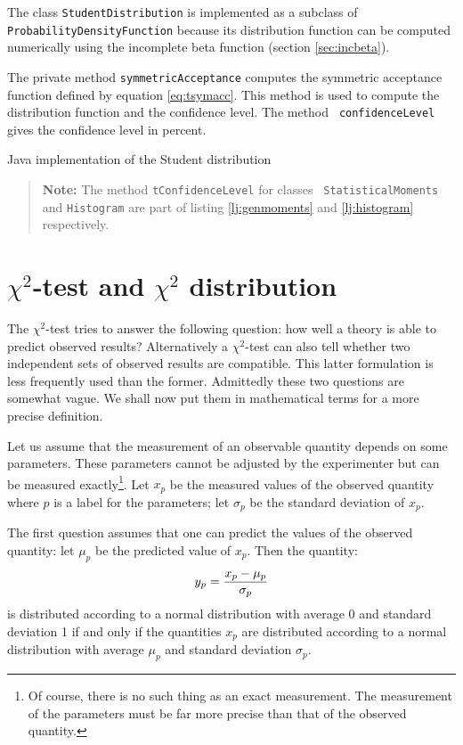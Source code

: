 \documentclass[twoside]{book}
\begin{document}
The class {\tt StudentDistribution} is implemented as a subclass
of {\tt ProbabilityDensityFunction} because its distribution
function can be computed numerically using the incomplete beta
function (\cf section \ref{sec:incbeta}).

The private method {\tt symmetricAcceptance} computes the
symmetric acceptance function defined by equation
\ref{eq:tsymacc}. This method is used to compute the distribution
function and the confidence level. The method {\tt
confidenceLevel} gives the confidence level in percent.
\begin{listing} Java implementation of the Student distribution \label{lj:tdist}

\end{listing}

\begin{quote}
{\bf Note:} The method {\tt tConfidenceLevel} for classes {\tt
StatisticalMoments} and {\tt Histogram} are part of listing
\ref{lj:genmoments} and \ref{lj:histogram} respectively.
\end{quote}

\section{$\chi^2$-test and $\chi^2$ distribution}
\label{sec:chitest} The $\chi^2$-test tries to answer the
following question: how well a theory is able to predict observed
results? Alternatively a $\chi^2$-test can also tell whether two
independent sets of observed results are compatible. This latter
formulation is less frequently used than the former. Admittedly
these two questions are somewhat vague. We shall now put them in
mathematical terms for a more precise definition.

Let us assume that the measurement of an observable quantity
depends on some parameters. These parameters cannot be adjusted by
the experimenter but can be measured exactly\footnote{Of course,
there is no such thing as an exact measurement. The measurement of
the parameters must be far more precise than that of the observed
quantity.}. Let $x_p$ be the measured values of the observed
quantity where $p$ is a label for the parameters; let $\sigma_p$
be the standard deviation of $x_p$.

The first question assumes that one can predict the values of the
observed quantity: let $\mu_p$ be the predicted value of $x_p$.
Then the quantity:
\begin{equation}
  y_p = { x_p - \mu_p \over \sigma_p}
\end{equation}
is distributed according to a normal distribution with average 0
and standard deviation 1 if and only if the quantities $x_p$ are
distributed according to a normal distribution with average
$\mu_p$ and standard deviation $\sigma_p$.
\end{document}
